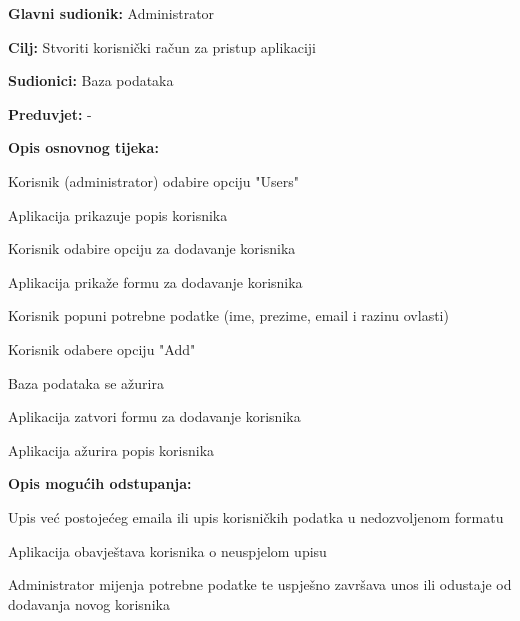 					\noindent {}
					\begin{packed_item}

						\item \textbf{Glavni sudionik:} Administrator
						\item \textbf{Cilj:} Stvoriti korisnički račun za pristup aplikaciji
						\item \textbf{Sudionici:} Baza podataka
						\item \textbf{Preduvjet:} - 
						\item \textbf{Opis osnovnog tijeka:}

						\item[] \begin{packed_enum}

							\item Korisnik (administrator) odabire opciju "Users"
							\item Aplikacija prikazuje popis korisnika
							\item Korisnik odabire opciju za dodavanje korisnika
							\item Aplikacija prikaže formu za dodavanje korisnika
							\item Korisnik popuni potrebne podatke (ime, prezime, email i razinu ovlasti)
							\item Korisnik odabere opciju "Add"
							\item Baza podataka se ažurira
							\item Aplikacija zatvori formu za dodavanje korisnika
							\item Aplikacija ažurira popis korisnika
						\end{packed_enum}

						\item \textbf{Opis mogućih odstupanja:}

						\item[] \begin{packed_item}

							\item[3.a] Upis već postojećeg emaila ili upis korisničkih
							podatka u nedozvoljenom formatu
							\item[] \begin{packed_enum}

								\item Aplikacija obavještava korisnika o neuspjelom upisu
								\item Administrator mijenja potrebne podatke te uspješno završava unos ili
								odustaje od dodavanja novog korisnika

							\end{packed_enum}

						\end{packed_item}
					\end{packed_item}

